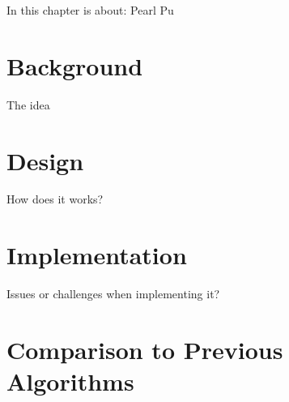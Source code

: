 In this chapter is about: Pearl Pu

\section{Background}
The idea
\cite{pearlpu}

\section{Design}
How does it works?

\section{Implementation}
Issues or challenges when implementing it?

\section{Comparison to Previous Algorithms}